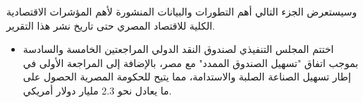 وسيستعرض الجزء التالي أهم التطورات والبيانات المنشورة لأهم المؤشرات الاقتصادية الكلية للاقتصاد المصري حتى تاريخ نشر هذا التقرير.
\begin{itemize}
    \item اختتم المجلس التنفيذي لصندوق النقد الدولي المراجعتين الخامسة والسادسة بموجب اتفاق "تسهيل الصندوق الممدد" مع مصر، بالإضافة إلى المراجعة الأولى في إطار تسهيل الصناعة الصلبة والاستدامة، مما يتيح للحكومة المصرية الحصول على ما يعادل نحو 2.3 مليار دولار أمريكي.
\end{itemize}
